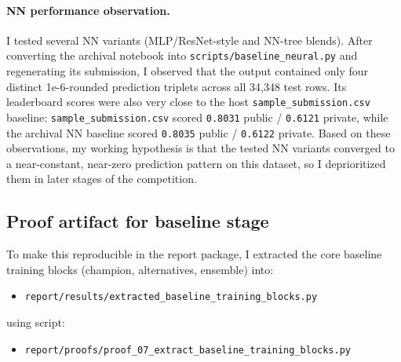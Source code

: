 \paragraph{NN performance observation.}
I tested several NN variants (MLP/ResNet-style and NN-tree blends). After converting the archival notebook into \texttt{scripts/baseline\_neural.py} and regenerating its submission, I observed that the output contained only four distinct 1e-6-rounded prediction triplets across all 34{,}348 test rows. Its leaderboard scores were also very close to the host \texttt{sample\_submission.csv} baseline: \texttt{sample\_submission.csv} scored \texttt{0.8031} public / \texttt{0.6121} private, while the archival NN baseline scored \texttt{0.8035} public / \texttt{0.6122} private. Based on these observations, my working hypothesis is that the tested NN variants converged to a near-constant, near-zero prediction pattern on this dataset, so I deprioritized them in later stages of the competition.

\subsection{Proof artifact for baseline stage}
To make this reproducible in the report package, I extracted the core baseline training blocks (champion, alternatives, ensemble) into:
\begin{itemize}[leftmargin=1.5em]
  \item \texttt{report/results/extracted\_baseline\_training\_blocks.py}
\end{itemize}
using script:
\begin{itemize}[leftmargin=1.5em]
  \item \texttt{report/proofs/proof\_07\_extract\_baseline\_training\_blocks.py}
\end{itemize}

